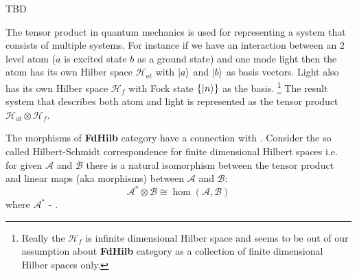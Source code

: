 \begin{definition}
  \label{def:tensor_product}
  TBD
\end{definition}

The tensor product in quantum mechanics is used for
representing a system that consists of multiple systems. For instance
if we have an interaction between an 2 level atom ($a$ is excited
state $b$ as a ground state) and one mode light then the
atom has its own Hilber space $\mathcal{H}_{at}$ with $\ket{a}$ and
$\ket{b}$ as basis 
vectors.  Light also has its own Hilber space $\mathcal{H}_f$ with Fock state
$\{\ket{n}\}$ as the basis.
\footnote{
  Really the $\mathcal{H}_f$ is infinite dimensional Hilber space and
  seems to be out of our assumption about \textbf{FdHilb} category as
  a collection of finite dimensional Hilber spaces only.
}
The result system that describes both atom
and light is represented as the tensor product $\mathcal{H}_{at}
\otimes \mathcal{H}_f$.

The morphisms of \textbf{FdHilb} category have a connection with
. Consider the so called Hilbert-Schmidt
correspondence for finite dimensional Hilbert spaces i.e. for given
$\mathcal{A}$ and $\mathcal{B}$ there is a natural isomorphism between
the tensor product and linear maps (aka morphisms) between
$\mathcal{A}$ and $\mathcal{B}$:
\[
\mathcal{A}^\ast \otimes \mathcal{B} \cong \hom(\mathcal{A}, \mathcal{B})
\]
where $\mathcal{A}^\ast$ - .


